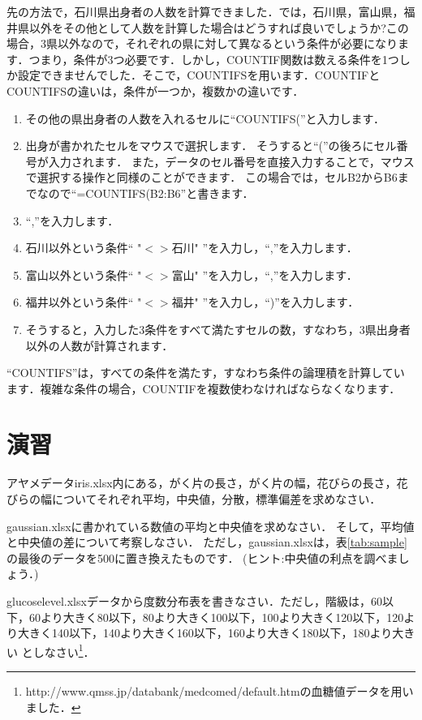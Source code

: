 先の方法で，石川県出身者の人数を計算できました．では，石川県，富山県，福井県以外をその他として人数を計算した場合はどうすれば良いでしょうか?この場合，3県以外なので，それぞれの県に対して異なるという条件が必要になります．つまり，条件が3つ必要です．しかし，COUNTIF関数は数える条件を1つしか設定できませんでした．そこで，COUNTIFSを用います．COUNTIFとCOUNTIFSの違いは，条件が一つか，複数かの違いです．
\begin{enumerate}
    \item その他の県出身者の人数を入れるセルに``COUNTIFS(''と入力します．
    \item 出身が書かれたセルをマウスで選択します．
    そうすると``(''の後ろにセル番号が入力されます．
    また，データのセル番号を直接入力することで，マウスで選択する操作と同様のことができます．
    この場合では，セルB2からB6までなので``=COUNTIFS(B2:B6''と書きます．
    \item ``,''を入力します．
    \item 石川以外という条件`` "$<>$石川" ''を入力し，``,''を入力します．
    \item 富山以外という条件`` "$<>$富山" ''を入力し，``,''を入力します．
    \item 福井以外という条件`` "$<>$福井" ''を入力し，``)''を入力します．
    \item そうすると，入力した3条件をすべて満たすセルの数，すなわち，3県出身者以外の人数が計算されます．
\end{enumerate}
``COUNTIFS''は，すべての条件を満たす，すなわち条件の論理積を計算しています．複雑な条件の場合，COUNTIFを複数使わなければならなくなります．

\section{演習}

\practice
アヤメデータiris.xlsx内にある，がく片の長さ，がく片の幅，花びらの長さ，花びらの幅についてそれぞれ平均，中央値，分散，標準偏差を求めなさい．

\practice
gaussian.xlsxに書かれている数値の平均と中央値を求めなさい．
そして，平均値と中央値の差について考察しなさい．
ただし，gaussian.xlsxは，表\ref{tab:sample}の最後のデータを500に置き換えたものです．
(ヒント:中央値の利点を調べましょう．)

\practice
glucoselevel.xlsxデータから度数分布表を書きなさい．ただし，階級は，60以下，60より大きく80以下，80より大きく100以下，100より大きく120以下，120より大きく140以下，140より大きく160以下，160より大きく180以下，180より大きい としなさい\footnote{http://www.qmss.jp/databank/medcomed/default.htmの血糖値データを用いました．}．

